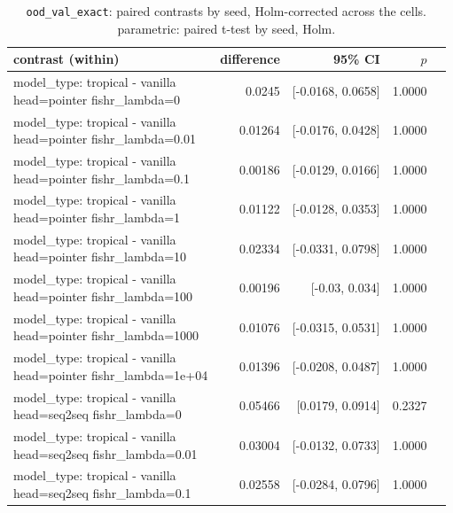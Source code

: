 \documentclass[10pt]{article}
\makeatletter
\newcommand{\stackcell}[1]{\begin{tabular}[t]{@{}l@{}}#1\end{tabular}}
\makeatother
\begin{document}
{\small
\begin{longtable}{lrrrl}
\caption{\texttt{ood\_val\_exact}: paired contrasts by seed, Holm-corrected across the cells. parametric: paired t-test by seed, Holm.}\label{tab:paired-ood_val_exact}\\
\toprule
contrast (within) & difference & 95\% CI & $p$ & \\
\midrule
\endhead
\stackcell{model\_type: tropical - vanilla\\\footnotesize head=pointer fishr\_lambda=0 } & 0.0245 & [-0.0168, 0.0658] & 1.0000 & \\
\stackcell{model\_type: tropical - vanilla\\\footnotesize head=pointer fishr\_lambda=0.01 } & 0.01264 & [-0.0176, 0.0428] & 1.0000 & \\
\stackcell{model\_type: tropical - vanilla\\\footnotesize head=pointer fishr\_lambda=0.1 } & 0.00186 & [-0.0129, 0.0166] & 1.0000 & \\
\stackcell{model\_type: tropical - vanilla\\\footnotesize head=pointer fishr\_lambda=1 } & 0.01122 & [-0.0128, 0.0353] & 1.0000 & \\
\stackcell{model\_type: tropical - vanilla\\\footnotesize head=pointer fishr\_lambda=10 } & 0.02334 & [-0.0331, 0.0798] & 1.0000 & \\
\stackcell{model\_type: tropical - vanilla\\\footnotesize head=pointer fishr\_lambda=100 } & 0.00196 & [-0.03, 0.034] & 1.0000 & \\
\stackcell{model\_type: tropical - vanilla\\\footnotesize head=pointer fishr\_lambda=1000 } & 0.01076 & [-0.0315, 0.0531] & 1.0000 & \\
\stackcell{model\_type: tropical - vanilla\\\footnotesize head=pointer fishr\_lambda=1e+04 } & 0.01396 & [-0.0208, 0.0487] & 1.0000 & \\
\stackcell{model\_type: tropical - vanilla\\\footnotesize head=seq2seq fishr\_lambda=0 } & 0.05466 & [0.0179, 0.0914] & 0.2327 & \\
\stackcell{model\_type: tropical - vanilla\\\footnotesize head=seq2seq fishr\_lambda=0.01 } & 0.03004 & [-0.0132, 0.0733] & 1.0000 & \\
\stackcell{model\_type: tropical - vanilla\\\footnotesize head=seq2seq fishr\_lambda=0.1 } & 0.02558 & [-0.0284, 0.0796] & 1.0000 & \\

\end{longtable}}
\end{document}
